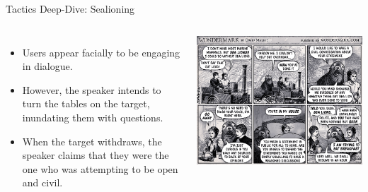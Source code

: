 \documentclass[nobackground,dvipsnames,table,aspectratio=169]{beamer}
\begin{document}
\begin{frame}{Tactics Deep-Dive: Sealioning}
    \begin{columns}
            \footnotesize
            \begin{itemize}
                \item Users appear facially to be engaging in dialogue.
                \item However, the speaker intends to turn the tables on the target, inundating them with questions.
                \item When the target withdraws, the speaker claims that they were the one who was attempting to be open and civil.
            \end{itemize}
            \includegraphics[width=\textwidth]{sealioning-comic}
    \end{columns}
\end{frame}
\end{document}
